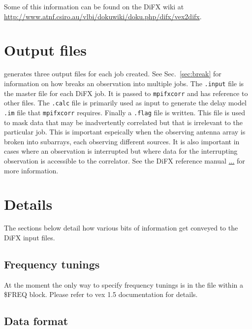 \documentclass[12pt]{article}
\begin{document}
Some of this information can be found on the DiFX wiki at \url{http://www.atnf.csiro.au/vlbi/dokuwiki/doku.php/difx/vex2difx}.

\section{Output files}

\vexdifx generates three output files for each job created.
See Sec.~\ref{sec:break} for information on how \vexdifx breaks an observation into multiple jobs.
The {\tt .input} file is the master file for each DiFX job.
It is passed to {\tt mpifxcorr} and has reference to other files.
The {\tt .calc} file is primarily used as input to generate the delay model {\tt .im} file that {\tt mpifxcorr} requires.
Finally a {\tt .flag} file is written.
This file is used to mask data that may be inadvertently correlated but that is irrelevant to the particular job.
This is important espeically when the observing antenna array is broken into subarrays, each observing different sources.
It is also important in cases where an observation is interrupted but where data for the interrupting observation is accessible to the correlator.
See the DiFX reference manual \url{...} for more information.

\section{Details}

The sections below detail how various bits of information get conveyed to the DiFX input files.

\subsection{Frequency tunings}

At the moment the only way to specify frequency tunings is in the \vx file within a \$FREQ block.
Please refer to vex 1.5 documentation for details.

\subsection{Data format}
\end{document}

